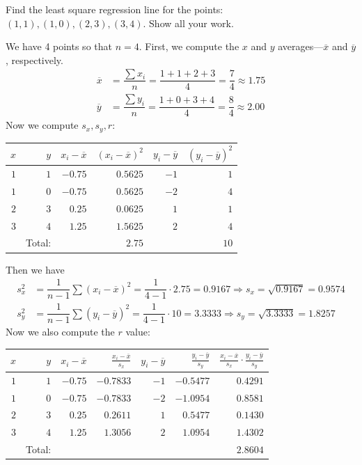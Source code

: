 \documentclass[11pt,letterpaper]{article}
\begin{document}

 Find the least square regression line for the points: $(1, 1), (1,0), (2,3), (3,4)$. Show all your work. \pspace

\sol We have 4 points so that $n= 4$. First, we compute the $x$ and $y$ averages---$\overline{x}$ and $\overline{y}$, respectively. 
	\[
	\begin{aligned}
	\overline{x}&= \dfrac{\sum x_i}{n}= \dfrac{1 + 1 + 2 + 3}{4}= \dfrac{7}{4} \approx 1.75 \\
	\overline{y}&= \dfrac{\sum y_i}{n}= \dfrac{1 + 0 + 3 + 4}{4}= \dfrac{8}{4} \approx 2.00 
	\end{aligned}
	\]
Now we compute $s_x, s_y, r$:
	\begin{table}[!ht]
	\centering
	\begin{tabular}{rrrrrr}
	$x$ & $y$ & $x_i - \overline{x}$ & $(x_i - \overline{x})^2$ & $y_i - \overline{y}$ & $(y_i - \overline{y})^2$ \\ \hline
	$1$ & $1$ & $-0.75$ & $0.5625$ & $-1$ & $1$ \\ 
	$1$ & $0$ & $-0.75$ & $0.5625$ & $-2$ & $4$ \\
	$2$ & $3$ & $0.25$ & $0.0625$ & $1$ & $1$ \\
	$3$ & $4$ & $1.25$ & $1.5625$ & $2$ & $4$ \\ \hline
	& Total: & & $2.75$ & & $10$ 
	\end{tabular}
	\end{table}
Then we have
	\[
	\begin{aligned}
	s_x^2&= \dfrac{1}{n - 1} \sum (x_i - \overline{x})^2= \dfrac{1}{4 - 1} \cdot 2.75= 0.9167 \Longrightarrow s_x= \sqrt{0.9167}= 0.9574 \\
	s_y^2&= \dfrac{1}{n - 1} \sum (y_i - \overline{y})^2= \dfrac{1}{4 - 1} \cdot 10= 3.3333 \Longrightarrow s_y= \sqrt{3.3333}= 1.8257
	\end{aligned}
	\]
Now we also compute the $r$ value:
	\begin{table}[!ht]
	\centering
	\begin{tabular}{rrrrrrr}
	$x$ & $y$ & $x_i - \overline{x}$ & $\frac{x_i - \overline{x}}{s_x}$ & $y_i - \overline{y}$ & $\frac{y_i - \overline{y}}{s_y}$ & $\frac{x_i - \overline{x}}{s_x} \cdot \frac{y_i - \overline{y}}{s_y}$ \\ \hline
	$1$ & $1$ & $-0.75$ & $-0.7833$ & $-1$ & $-0.5477$ & $0.4291$ \\ 
	$1$ & $0$ & $-0.75$ & $-0.7833$ & $-2$ & $-1.0954$ & $0.8581$ \\
	$2$ & $3$ & $0.25$ & $0.2611$ & $1$ & $0.5477$ & $0.1430$ \\
	$3$ & $4$ & $1.25$ & $1.3056$ & $2$ & $1.0954$ & $1.4302$ \\ \hline
	& Total: & &  & & & $2.8604$
	\end{tabular}
	\end{table}
\end{document}
